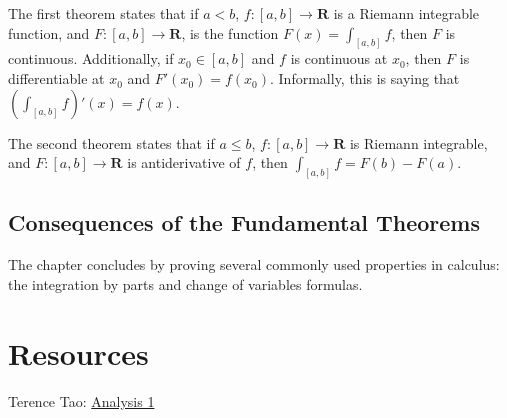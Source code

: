 \documentclass[answers,12pt]{exam}
\begin{document}
The first theorem states that if $a < b$, $f:[a,b] \to \mathbf{R}$ is a Riemann integrable function, and $F:[a,b] \to \mathbf{R}$, is the function $F(x) = \int_{[a,b]} f$, then $F$ is continuous.
Additionally, if $x_0 \in [a,b]$ and $f$ is continuous at $x_0$, then $F$ is differentiable at $x_0$ and $F'(x_0) = f(x_0)$.
Informally, this is saying that $(\int_{[a,b]}f)'(x) = f(x)$.

The second theorem states that if $a \leq b$, $f: [a,b] \to \mathbf{R}$ is Riemann integrable, and $F: [a,b] \to \mathbf{R}$ is antiderivative of $f$, then $\int_{[a,b]}f = F(b)-F(a)$.

\subsection{Consequences of the Fundamental Theorems}
The chapter concludes by proving several commonly used properties in calculus: the integration by parts and change of variables formulas.

\section{Resources}
Terence Tao: \href{https://terrytao.wordpress.com/books/analysis-i/}{Analysis 1}
\end{document}
